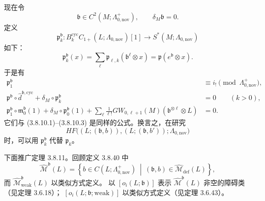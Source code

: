 现在令
\[
 \mathfrak b\in C^2(M;\Lambda^+_{0,\mathrm{nov}}),
 \qquad \delta_M\mathfrak b=0.
\]
定义
\[
 \mathfrak p_k^{\mathfrak b}\colon
 B_k^{\mathrm{cyc}}C_{1+}(L;\Lambda_{0,\mathrm{nov}})[1]
 \longrightarrow S^*(M;\Lambda_{0,\mathrm{nov}})
\]
如下：
\[
 \mathfrak p_k^{\mathfrak b}(x)
 =\sum_\ell
 \mathfrak p_{\ell,k}(\mathfrak b^\ell\otimes x)
 =\mathfrak p(e^{\mathfrak b}\otimes x).
\]
于是有
\begin{align}
 \mathfrak p_1^{\mathfrak b}
 &\equiv i_!\pmod{\Lambda^+_{0,\mathrm{nov}}},
 \tag{3.8.87.1}\label{eq:3-8-87-1}\\
 \mathfrak p^{\mathfrak b}\circ
 \widehat d^{\mathfrak b,\mathrm{cyc}}
 +\delta_M\circ\mathfrak p_k^{\mathfrak b}
 &=0
 \qquad(k>0),
 \tag{3.8.87.2}\label{eq:3-8-87-2}\\
 \mathfrak p_1^{\mathfrak b}\circ
 \mathfrak m_0^{\mathfrak b}(1)
 +\delta_M\circ\mathfrak p_0^{\mathfrak b}(1)
 +\sum_\ell\frac1{\ell!}
 GW_{0,\ell+1}(M)
 (\mathfrak b^{\otimes\ell}\otimes L)
 &=0.
 \tag{3.8.87.3}\label{eq:3-8-87-3}
\end{align}
它们与 (3.8.10.1)--(3.8.10.3) 是同样的公式。换言之，在研究
\[
 HF\bigl(
 (L;(\mathfrak b,b)),(L;(\mathfrak b,b'));
 \Lambda_{0,\mathrm{nov}}
 \bigr)
\]
时，可以用 $\mathfrak p_k^{\mathfrak b}$ 代替 $\mathfrak p_k$。

下面推广定理 3.8.11。回顾定义 3.8.40 中
\[
 \widehat{\mathcal M}^{\mathfrak b}(L)
 =\left\{
 b\in C(L;\Lambda^+_{0,\mathrm{nov}})
 \ \middle|\
 (\mathfrak b,b)\in\widehat{\mathcal M}_{\mathrm{def}}(L)
 \right\},
\]
而 $\widehat{\mathcal M}^{\mathfrak b}_{\mathrm{weak}}(L)$ 以类似方式定义。
以 $[o_i(L;\mathfrak b)]$ 表示
$\widehat{\mathcal M}^{\mathfrak b}(L)$ 非空的障碍类（见定理 3.6.18）；
$[o_i(L;\mathfrak b;\mathrm{weak})]$ 以类似方式定义（见定理 3.6.43）。

